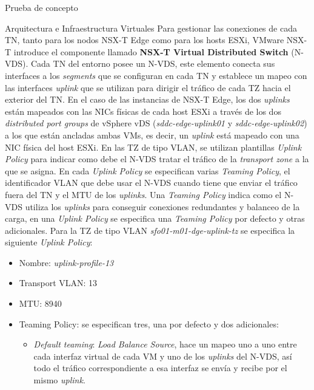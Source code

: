 \begin{section}{Prueba de concepto}
\begin{subsection}{Arquitectura e Infraestructura Virtuales\cite{CFVirtInfraes}}
Para gestionar las conexiones de cada TN, tanto para los nodos NSX-T Edge como para los hosts ESXi, VMware NSX-T introduce el componente llamado \textbf{NSX-T Virtual Distributed Switch} (N-VDS). Cada TN del entorno posee un N-VDS, este elemento conecta sus interfaces a los \textit{segments} que se configuran en cada TN y establece un mapeo con las interfaces \textit{uplink} que se utilizan para dirigir el tráfico de cada TZ hacia el exterior del TN. En el caso de las instancias de NSX-T Edge, los dos \textit{uplinks} están mapeados con las NICs físicas de cada host ESXi a través de los dos \textit{distributed port groups} de vSphere vDS (\textit{sddc-edge-uplink01} y \textit{sddc-edge-uplink02}) a los que están ancladas ambas VMs, es decir, un \textit{uplink} está mapeado con una NIC física del host ESXi. 
En las TZ de tipo VLAN, se utilizan plantillas \textit{Uplink Policy} para indicar como debe el N-VDS tratar el tráfico de la \textit{transport zone} a la que se asigna. En cada \textit{Uplink Policy} se especifican varias \textit{Teaming Policy}, el identificador VLAN que debe usar el N-VDS cuando tiene que enviar el tráfico fuera del TN y el MTU de los \textit{uplinks}. Una \textit{Teaming Policy} indica como el N-VDS utiliza los \textit{uplinks} para conseguir conexiones redundantes y balanceo de la carga, en una \textit{Uplink Policy} se especifica una \textit{Teaming Policy} por defecto y otras adicionales.
Para la TZ de tipo VLAN \textit{sfo01-m01-dge-uplink-tz} se especifica la siguiente \textit{Uplink Policy}:
\begin{itemize}
  \item Nombre: \textit{uplink-profile-13}
  \item Transport VLAN: 13
  \item MTU: 8940
  \item Teaming Policy: se especifican tres, una por defecto y dos adicionales:
    \begin{itemize}
      \item \textit{Default teaming}: \textit{Load Balance Source}, hace un mapeo uno a uno entre cada interfaz virtual de cada VM y uno de los \textit{uplinks} del N-VDS, así todo el tráfico correspondiente a esa interfaz se envía y recibe por el mismo \textit{uplink}.
      

\end{itemize}
\end{itemize}
\end{subsection}
\end{section}
